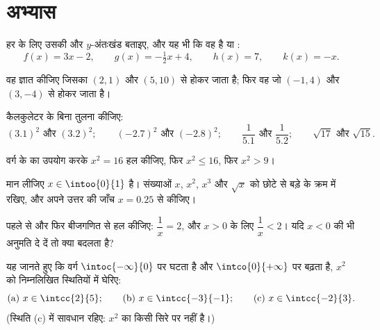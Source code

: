 \section{अभ्यास}

\begin{exercise}[$\star$]\label{exo:g10:reffunc:1}
हर  के लिए उसकी  और $y$-अंतःखंड बताइए, और यह भी कि वह
 है या :
\[
f(x) = 3x - 2, \qquad
g(x) = -\tfrac12 x + 4, \qquad
h(x) = 7, \qquad
k(x) = -x .
\]
\end{exercise}

\begin{exercise}[$\star$]\label{exo:g10:reffunc:2}
वह  ज्ञात कीजिए जिसका  $(2, 1)$ और $(5, 10)$ से होकर जाता है; फिर वह
जो $(-1, 4)$ और $(3, -4)$ से होकर जाता है।
\end{exercise}

\begin{exercise}[$\star$]\label{exo:g10:reffunc:3}
कैलकुलेटर के बिना तुलना कीजिए:
\[
(3.1)^2 \text{ और } (3.2)^2; \qquad
(-2.7)^2 \text{ और } (-2.8)^2; \qquad
\frac{1}{5.1} \text{ और } \frac{1}{5.2}; \qquad
\sqrt{17} \text{ और } \sqrt{15}.
\]
\end{exercise}

\begin{exercise}[$\star$]\label{exo:g10:reffunc:4}
वर्ग  के  का उपयोग करके $x^2 = 16$ हल कीजिए, फिर $x^2 \leq 16$, फिर $x^2 > 9$।
\end{exercise}

\begin{exercise}[$\star$]\label{exo:g10:reffunc:5}
मान लीजिए $x \in \intoo{0}{1}$ है। संख्याओं $x$, $x^2$, $x^3$ और $\sqrt x$ को छोटे से बड़े
के क्रम में रखिए, और अपने उत्तर की जाँच $x = 0.25$ से कीजिए।
\end{exercise}

\begin{exercise}[$\star\star$]\label{exo:g10:reffunc:6}
पहले  से और फिर बीजगणित से हल कीजिए: $\dfrac1x = 2$, और $x > 0$ के लिए $\dfrac1x < 2$।
यदि $x < 0$ की भी अनुमति दे दें तो क्या बदलता है?
\end{exercise}

\begin{exercise}[$\star\star$]\label{exo:g10:reffunc:7}
यह जानते हुए कि वर्ग  $\intoc{-\infty}{0}$ पर घटता है और $\intco{0}{+\infty}$ पर बढ़ता है, $x^2$ को
निम्नलिखित स्थितियों में घेरिए:
\[
\text{(a) } x \in \intcc{2}{5};
\qquad
\text{(b) } x \in \intcc{-3}{-1};
\qquad
\text{(c) } x \in \intcc{-2}{3}.
\]
(स्थिति (c) में सावधान रहिए: $x^2$ का  किसी सिरे पर नहीं है।)
\end{exercise}

